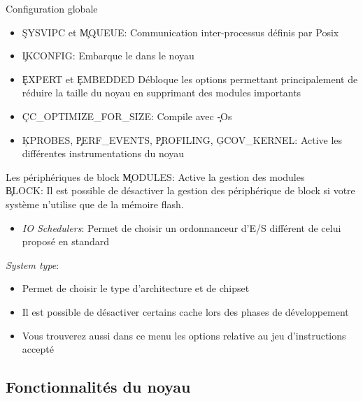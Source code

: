 \begin{frame}[fragile=singleslide]{Configuration globale}
  \begin{itemize} 
  \item  \c{SYSVIPC} et  \c{MQUEUE}:  Communication inter-processus
    définis par Posix
  \item \c{IKCONFIG}: Embarque le  dans le noyau 
  \item  \c{EXPERT} et  \c{EMBEDDED} Débloque  les  options permettant
    principalement  de réduire la  taille du  noyau en  supprimant des
    modules importants
  \item \c{CC_OPTIMIZE_FOR_SIZE}: Compile avec \c{-Os}
  \item \c{KPROBES},  \c{PERF_EVENTS}, \c{PROFILING}, \c{GCOV_KERNEL}:
    Active les différentes instrumentations du noyau
  \end{itemize} 
\end{frame}

\begin{frame}[fragile=singleslide]{Les périphériques de block}
  \c{MODULES}: Active la gestion des modules
  \\[2ex]
  \c{BLOCK}: Il est possible  de désactiver la gestion des périphérique
  de block si votre système n'utilise que de la mémoire flash.
  \begin{itemize} 
  \item \emph{IO  Schedulers}: Permet de choisir  un ordonnanceur d'E/S
    différent de celui proposé en standard
  \end{itemize} 
  \emph{System type}:
  \begin{itemize} 
  \item Permet de choisir le type d'architecture et de chipset
  \item Il est  possible de désactiver certains cache  lors des phases
    de développement
  \item Vous trouverez aussi dans  ce menu les options relative au jeu
    d'instructions accepté
  \end{itemize}
\end{frame}

\subsection{Fonctionnalités du noyau}

